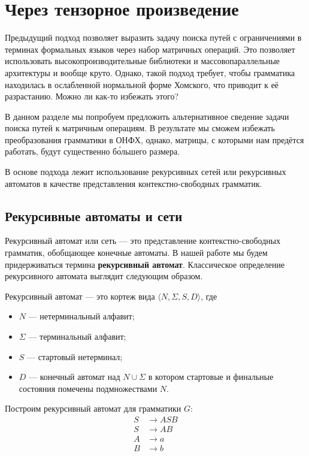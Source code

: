 \chapter{Через тензорное произведение}

Предыдущий подход позволяет выразить задачу поиска путей с ограничениями в терминах формальных языков через набор матричных операций.
Это позволяет использовать высокопроизводительные библиотеки и массовопараллельные архитектуры и вообще круто.
Однако, такой подход требует, чтобы грамматика находилась в ослабленной нормальной форме Хомского, что приводит к её разрастанию.
Можно ли как-то избежать этого?

В данном разделе мы попробуем предложить альтернативное сведение задачи поиска путей к матричным операциям.
В результате мы сможем избежать преобразования грамматики в ОНФХ, однако, матрицы, с которыми нам предётся работать, будут существенно б\'{о}льшего размера.

В основе подхода лежит использование рекурсивных сетей или рекурсивных автоматов в качестве представления контекстно-свободных грамматик.

\section{Рекурсивные автоматы и сети}

Рекурсивный автомат или сеть --- это представление контекстно-свободных грамматик, обобщающее конечные автоматы.
В нашей работе мы будем придерживаться термина \textbf{рекурсивный автомат}. 
Классическое определение рекурсивного автомата выглядит следующим образом.

\begin{definition}
Рекурсивный автомат --- это кортеж вида $\langle N, \Sigma, S, D \rangle$, где
\begin{itemize}
\item $N$ --- нетерминальный алфавит;
\item $\Sigma$ --- терминальный алфавит;
\item $S$ --- стартовый нетерминал;
\item $D$ --- конечный автомат над $N \cup \Sigma$ в котором стартовые и финальные состояния помечены подмножествами $N$.
\end{itemize}
\end{definition}



Построим рекурсивный автомат для грамматики $G$:
\begin{align*}
S   &\to    A S B \\ 
S   &\to    A B \\
A   &\to    a \\
B   &\to    b
\end{align*}


